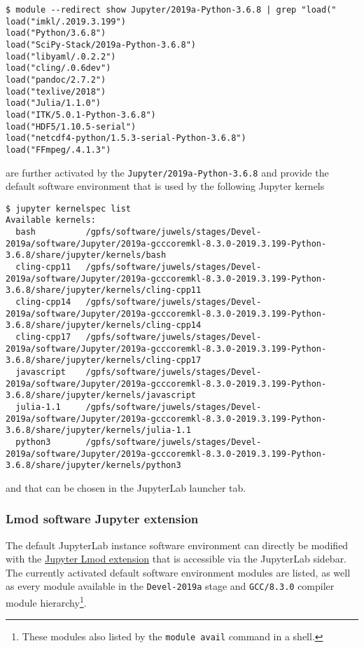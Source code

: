 \begin{verbatim}
$ module --redirect show Jupyter/2019a-Python-3.6.8 | grep "load("
load("imkl/.2019.3.199")
load("Python/3.6.8")
load("SciPy-Stack/2019a-Python-3.6.8")
load("libyaml/.0.2.2")
load("cling/.0.6dev")
load("pandoc/2.7.2")
load("texlive/2018")
load("Julia/1.1.0")
load("ITK/5.0.1-Python-3.6.8")
load("HDF5/1.10.5-serial")
load("netcdf4-python/1.5.3-serial-Python-3.6.8")
load("FFmpeg/.4.1.3")
\end{verbatim}
%
are further activated by the \verb|Jupyter/2019a-Python-3.6.8| and provide the default software environment that is used by the following Jupyter kernels
%
\begin{verbatim}
$ jupyter kernelspec list
Available kernels:
  bash          /gpfs/software/juwels/stages/Devel-2019a/software/Jupyter/2019a-gcccoremkl-8.3.0-2019.3.199-Python-3.6.8/share/jupyter/kernels/bash
  cling-cpp11   /gpfs/software/juwels/stages/Devel-2019a/software/Jupyter/2019a-gcccoremkl-8.3.0-2019.3.199-Python-3.6.8/share/jupyter/kernels/cling-cpp11
  cling-cpp14   /gpfs/software/juwels/stages/Devel-2019a/software/Jupyter/2019a-gcccoremkl-8.3.0-2019.3.199-Python-3.6.8/share/jupyter/kernels/cling-cpp14
  cling-cpp17   /gpfs/software/juwels/stages/Devel-2019a/software/Jupyter/2019a-gcccoremkl-8.3.0-2019.3.199-Python-3.6.8/share/jupyter/kernels/cling-cpp17
  javascript    /gpfs/software/juwels/stages/Devel-2019a/software/Jupyter/2019a-gcccoremkl-8.3.0-2019.3.199-Python-3.6.8/share/jupyter/kernels/javascript
  julia-1.1     /gpfs/software/juwels/stages/Devel-2019a/software/Jupyter/2019a-gcccoremkl-8.3.0-2019.3.199-Python-3.6.8/share/jupyter/kernels/julia-1.1
  python3       /gpfs/software/juwels/stages/Devel-2019a/software/Jupyter/2019a-gcccoremkl-8.3.0-2019.3.199-Python-3.6.8/share/jupyter/kernels/python3
\end{verbatim}
%
and that can be chosen in the JupyterLab launcher tab.

\subsubsection{Lmod software Jupyter extension}

The default JupyterLab instance software environment can directly be modified with the \href{https://github.com/cmd-ntrf/jupyter-lmod}{Jupyter Lmod extension} that is accessible via the JupyterLab sidebar.
The currently activated default software environment modules are listed, as well as every module available in the \verb|Devel-2019a| stage and \verb|GCC/8.3.0| compiler module hierarchy\cprotect\footnote{These modules also listed by the \verb|module avail| command in a shell.}.

